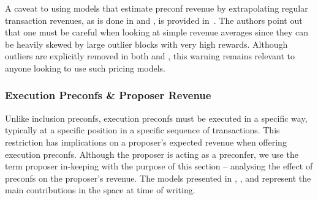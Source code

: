 \documentclass[a4paper]{article}
\theoremstyle{boldstyle}
\begin{document}
    A caveat to using models that estimate preconf revenue by extrapolating regular transaction revenues, as is done in \cite{W:APricingModelforInclusionPreconfirmations} and \cite{W:PricingTransactionsforPreconfirmation}, is provided in~\cite{W:MeasuringValidatorEconomics}. The authors point out that one must be careful when looking at simple revenue averages since they can be heavily skewed by large outlier blocks with very high rewards. Although outliers are explicitly removed in both \cite{W:APricingModelforInclusionPreconfirmations} and \cite{W:PricingTransactionsforPreconfirmation}, this warning remains relevant to anyone looking to use such pricing models.
    
    
    \subsubsection{Execution Preconfs \& Proposer Revenue}\label{sec:execpreconfproposerrevenue}
    Unlike inclusion preconfs, execution preconfs must be executed in a specific way, typically at a specific position in a specific sequence of transactions. This restriction has implications on a proposer's expected revenue when offering execution preconfs. Although the proposer is acting as a preconfer, we use the term proposer in-keeping with the purpose of this section -- analysing the effect of preconfs on the proposer's revenue.  
    The models presented in \cite{W:EstimatingtheRevenuefromIndependentSub-SlotAuctionPreconfirmations}, \cite{ W:AnalysingExpectedProposerRevenuefromPreconfirmations}, and \cite{W:PreconfirmationsundertheNOlens} represent the main contributions in the space at time of writing. 
    
\end{document}
